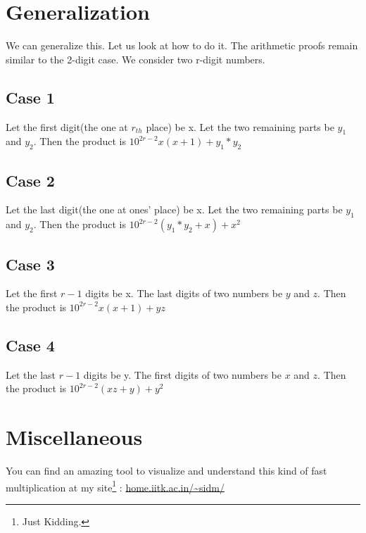 \section{Generalization}
We can generalize this. Let us look at how to do it. The arithmetic proofs remain similar to the 2-digit case. We consider two r-digit numbers.



\subsection{Case 1}
Let the first digit(the one at $r_{th}$ place) be x. Let the two remaining parts be $y_1$ and $y_2$. Then the product is $10^{2r-2}x(x+1)+y_1*y_2$
\subsection{Case 2}
Let the last digit(the one at ones' place) be x. Let the two remaining parts be $y_1$ and $y_2$. Then the product is $10^{2r-2}(y_1*y_2+x)+x^2$
\subsection{Case 3}
Let the first $r-1$ digits be x. The last digits of two numbers be $y$ and $z$. Then the product is $10^{2r-2}x(x + 1)+yz$
\subsection{Case 4}
Let the last $r-1$ digits be y. The first digits of two numbers be $x$ and $z$. Then the product is $10^{2r-2}(xz+y)+y^2$
\newpage
\section{Miscellaneous}
\label{sec:misc}
You can find an amazing tool to visualize and understand this kind of fast multiplication at my site\footnote{Just Kidding.} : \url{home.iitk.ac.in/~sidm/}

